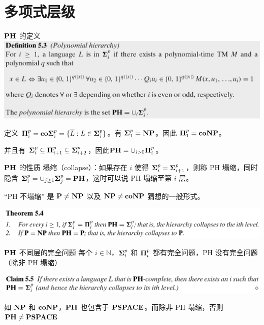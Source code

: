 \documentclass[UTF8,aspectratio=169,mathserif]{beamer}
\begin{document}
	\section{多项式层级}
	\begin{frame}{$\bf PH$ 的定义}
		\includegraphics[width=\linewidth]{../../5 & 6/note.assets/image-20210426160324184.png}\newline
		
		定义 ${\bf\Pi}_i^p={\bf co\Sigma}_i^p=\{\overline{L}:L\in{\bf\Sigma}_i^p\}$。有 ${\bf\Sigma}_1^p={\bf NP}$。因此 ${{\bf\Pi}_1^p={\bf coNP}}$。
		
		并且有 ${\bf\Sigma}_i^p \subseteq{\bf\Pi}_{i+1}^p\subseteq{\bf\Sigma}_{i+2}^p$，因此${\bf PH}=\cup_{i>0}{\bf\Pi}_i^p$。
	\end{frame}
	
	\begin{frame}{$\bf PH$ 的性质}
		塌缩（collapse）：如果存在 $i$ 使得 ${{\bf\Sigma}_i^p}={{\bf\Sigma}_{i+1}^p}$，则称 PH 塌缩，同时隐含 ${{\bf\Sigma}_i^p}={\cup}_{j\ge1}{{\bf\Sigma}_j^p}={\bf PH}$，这时可以说 PH 塌缩至第 $i$ 层。\newline
		
		“PH 不塌缩” 是 $\bf P\neq NP$ 以及 $\bf NP\neq coNP$ 猜想的一般形式。\newline
		
		\includegraphics[width=\linewidth]{../../5 & 6/note.assets/image-20210427092228569.png}
	\end{frame}
	
	\begin{frame}{$\bf PH$ 不同层的完全问题}
		每个 $i\in\mathbb{N}$，${{\bf\Sigma}_i^p}$ 和 ${{\bf\Pi}_i^p}$ 都有完全问题，PH 没有完全问题（除非 PH 塌缩）\newline
		
		\includegraphics[width=\linewidth]{../../5 & 6/note.assets/image-20210427092442758.png}\newline
		
		如 $\bf NP$ 和 $\bf coNP$，$\bf PH$ 也包含于 $\bf PSPACE$。而除非 PH 塌缩，否则 $\bf PH\neq PSPACE$
	\end{frame}
	
\end{document}

